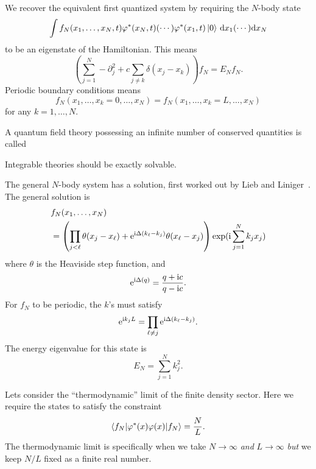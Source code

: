 We recover the equivalent first quantized system by requiring the
$N$-body state
\begin{equation*}
\int f_{N}(x_{1},\dots,x_{N},t)\varphi^{*}(x_{N},t)(\cdots)\varphi^{*}(x_{1},t)\ket{0}\,\mathrm{d}{x_{1}}(\cdots)\mathrm{d}{x_{N}}
\end{equation*}
to be an eigenstate of the Hamiltonian. This means
\begin{equation}
\left(\sum^{N}_{j=1}-\partial_{j}^{2}+c\sum_{j\neq k}\delta(x_{j}-x_{k})\right)f_{N}
= E_{N}f_{N}.
\end{equation}
Periodic boundary conditions means
\begin{equation}
 f_{N}(x_{1},\dots,x_{k}=0,\dots,x_{N})
=f_{N}(x_{1},\dots,x_{k}=L,\dots,x_{N})
\end{equation}
for any $k=1,\dots,N$.

\begin{definition}
A quantum field theory possessing an infinite number of
conserved quantities is called 
\end{definition}

\begin{theorem}
Integrable theories should be exactly solvable.
\end{theorem}

The general $N$-body system has a solution, first worked out by Lieb and
Liniger~\cite{Lieb:1963rt,Lieb:1963zz}. The general solution is
\begin{equation}
\begin{split}
&f_{N}(x_{1},\dots,x_{N})\\
&=
\left(\prod_{j<\ell}
\theta(x_{j}-x_{\ell})+\mathrm{e}^{\mathrm{i}\Delta(k_{\ell}-k_{j})}\theta(x_{\ell}-x_{j})\right)
\exp(\mathrm{i}\sum^{N}_{j=1}k_{j}x_{j})
\end{split}
\end{equation}
where $\theta$ is the Heaviside step function, and
\begin{equation}
\mathrm{e}^{\mathrm{i}\Delta(q)}=\frac{q+\mathrm{i} c}{q-\mathrm{i} c}.
\end{equation}
For $f_{N}$ to be periodic, the $k$'s must satisfy
\begin{equation}
\mathrm{e}^{\mathrm{i} k_{j}L} = \prod_{\ell\neq j}\mathrm{e}^{\mathrm{i}\Delta(k_{\ell}-k_{j})}.
\end{equation}
The energy eigenvalue for this state is 
\begin{equation}
E_{N}=\sum^{N}_{j=1}k_{j}^{2}.
\end{equation}


Lets consider the ``thermodynamic'' limit of the finite density
sector. Here we require the states to satisfy the constraint
\begin{equation}
\braket{f_{N}|\varphi^{*}(x)\varphi(x)|f_{N}}=\frac{N}{L}.
\end{equation}
The thermodynamic limit is specifically when we take $N\to\infty$
\emph{and} $L\to\infty$ \emph{but} we keep $N/L$ fixed as a finite real
number. 


